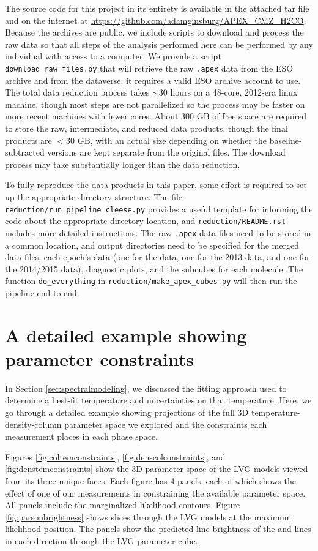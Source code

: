 The source code for this project in its entirety is available in the attached
tar file and on the internet at
\url{https://github.com/adamginsburg/APEX_CMZ_H2CO}.  Because the archives are
public, we include scripts to download and process the raw data so that all
steps of the analysis performed here can be performed by any individual with
access to a computer.  We provide a script \texttt{download\_raw\_files.py}
that will retrieve the raw \texttt{.apex} data from the ESO archive and from
the dataverse; it requires a valid ESO archive account to use. The total data
reduction process takes $\sim30$ hours on a 48-core, 2012-era linux machine,
though most steps are not parallelized so the process may be faster on more
recent machines with fewer cores.  About 300 GB of free space are required to
store the raw, intermediate, and reduced data products, though the final
products are $<30$ GB, with an actual size depending on whether the
baseline-subtracted versions are kept separate from the original files.  The
download process may take substantially longer than the data reduction.

To fully reproduce the data products in this paper, some effort is required to
set up the appropriate directory structure.  The file
\texttt{reduction/run\_pipeline\_cleese.py} provides a useful template for
informing the code about the appropriate directory location, and
\texttt{reduction/README.rst} includes more detailed instructions.  The raw
\texttt{.apex} data files need to be stored in a common location, and output
directories need to be specified for the merged data files, each epoch's data
(one for the \citet{Ao2013a} data, one for the 2013 data, and one for the
2014/2015 data), diagnostic plots, and the subcubes for each molecule.  The
function \texttt{do\_everything} in \texttt{reduction/make\_apex\_cubes.py}
will then run the pipeline end-to-end.



\section{A detailed example showing parameter constraints}
In Section \ref{sec:spectralmodeling}, we discussed the fitting approach used
to determine a best-fit temperature and uncertainties on that temperature.
Here, we go through a detailed example showing projections of the full 3D
temperature-density-column parameter space we explored and the constraints
each measurement places in each phase space.

Figures \ref{fig:coltemconstraints}, \ref{fig:denscolconstraints}, and
\ref{fig:denstemconstraints} show the 3D parameter space of the LVG models
viewed from its three unique faces.  Each figure has 4 panels, each of which
shows the effect of one of our measurements in constraining the available
parameter space.  All panels include the marginalized likelihood contours.
Figure \ref{fig:parsonbrightness} shows slices through the LVG models at the
maximum likelihood position.  The panels show the predicted line brightness of
the \threeohthree and \threetwoone lines in each direction through the LVG
parameter cube.


